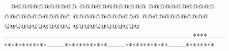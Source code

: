     @@@@@@@@@@@@        @@@@@@@@@@@@        @@@@@@@@@@@@        @@@@@@@@@@@@        @@@@@@@@@@@@        @@@@@@@@@@@@        @@@@@@@@@@@@        @@@@@@@@@@@@    --------------------------------------------------------------------------------****--------************--------************--------************--------********
